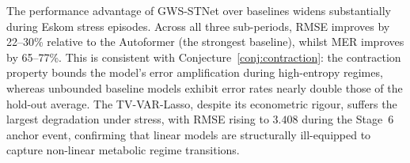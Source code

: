 \documentclass[11pt,a4paper]{article}  %
\theoremstyle{plain}
\theoremstyle{definition}
\theoremstyle{remark}
\begin{document}
\begin{table}[H]
\centering
\caption{Predictive performance during Eskom stress episodes.
Sub-period RMSE (units: $10^{-2}$) and MER. ``Stage~6 Anchor''
lies in the walk-forward window; the two ``Stage~4+'' sub-periods
are in the hold-out set.}
\label{tab:eskom}
\setlength{\tabcolsep}{4pt}
\end{table}

The performance advantage of GWS-STNet over baselines widens
substantially during Eskom stress episodes. Across all three
sub-periods, RMSE improves by 22--30\% relative to the
Autoformer (the strongest baseline), whilst MER improves by
65--77\%. This is consistent with Conjecture~\ref{conj:contraction}:
the contraction property bounds the model's error amplification
during high-entropy regimes, whereas unbounded baseline models
exhibit error rates nearly double those of the hold-out average.
The TV-VAR-Lasso, despite its econometric rigour, suffers the
largest degradation under stress, with RMSE rising to $3.408$
during the Stage~6 anchor event, confirming that linear models
are structurally ill-equipped to capture non-linear metabolic
regime transitions.
\end{document}
